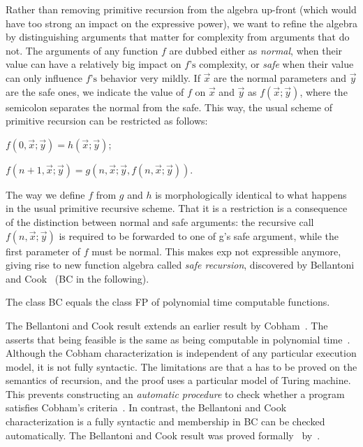 Rather than removing primitive recursion from the algebra up-front (which would have too strong an impact on the expressive power), %
we want to refine the algebra by distinguishing arguments that matter for complexity from arguments that do not.
The arguments of any function \(f\) are dubbed either as \emph{normal}, when their value can have a relatively big impact on \(f\text{'s}\) complexity, or \emph{safe} when their value can only influence \(f\)\(\text{'s}\) behavior very mildly. %
If \(\vec{x}\) are the normal parameters and \(\vec{y}\) are the safe ones,
we indicate the value of \(f\) on \(\vec{x}\) and \(\vec{y}\) as \(f(\vec{x};\vec{y})\),
where the semicolon separates the normal from the safe.
This way, the usual scheme of primitive recursion can be restricted as follows:

\begin{center}
    \(f (0, \vec{x};\vec{y}) = h (\vec{x};\vec{y})\);

    \(f (n + 1,\vec{x};{ }\vec{y}) = g (n, \vec{x}; \vec{y}, f(n,\vec{x}; \vec{y})) \).
\end{center}

\noindent The way we define \(f\) from \(g\) and \(h\) is morphologically identical to what happens in the usual primitive recursive scheme.
That it is a restriction is a consequence of the distinction between normal and safe arguments: the recursive call \(f(n,\vec{x}; \vec{y})\) is required to be forwarded to one of g's safe argument, while the first parameter of \(f\) must be normal.
This makes exp not expressible anymore, giving rise to new function algebra called \emph{safe recursion}, discovered by Bellantoni and Cook~\cite{bellantoni1992} (BC in the following).

\begin{theorem}
The class BC equals the class FP of polynomial time computable functions.
\end{theorem}

The Bellantoni and Cook result extends an earlier result by Cobham~\cite{cobham1965}.
The  asserts that being feasible is the same as being computable in polynomial time~\cite{cobham1965,edmonds1965}.
Although the Cobham characterization is independent of any particular execution model, it is not fully syntactic.
The limitations are that a  has to be proved on the semantics of recursion, and the proof uses a particular model of Turing machine.
This prevents constructing an \emph{automatic procedure} to check whether a program satisfies Cobham's criteria~\cite{heraud2011}.
In contrast, the Bellantoni and Cook characterization is a fully syntactic and membership in BC can be checked automatically.
The Bellantoni and Cook result was proved formally~\cite{bc_formal} by~\textcite{heraud2011}.

